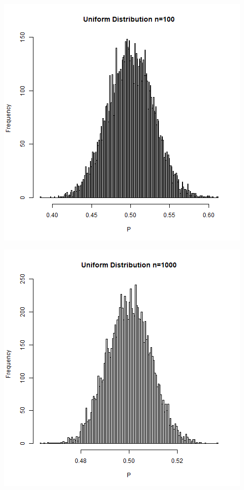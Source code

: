 \documentclass{article}
\begin{document}
\begin{CJK}{UTF8}{gbsn}
\begin{minipage}{0.5\textwidth}
\end{minipage}
\begin{minipage}{0.5\textwidth}
    \includegraphics[scale=0.6]{hist2-3.png}
\end{minipage}
\begin{minipage}{0.5\textwidth}
    \includegraphics[scale=0.6]{hist2-4.png}
\end{minipage}

\end{CJK}
\end{document}
